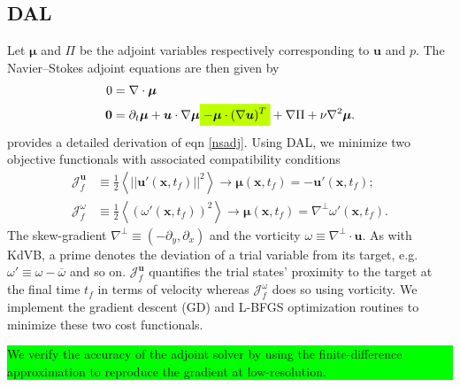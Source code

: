 \documentclass[%
 reprint,
 amsmath,amssymb,
 aps,
 pre,
]{revtex4-2}
\newcommand{\hly}[1]{\colorbox{lime}{\parbox{\columnwidth}{#1}}}
\newcommand{\highlightmath}[1]{\colorbox{lime}{$\displaystyle #1$}}
\renewcommand{\vec}[1]{\boldsymbol{#1}}
\newcommand{\grad}{\nabla}
\newcommand{\JUf}{\mathcal{J}^{\vec{u}}_f}
\newcommand{\Jwf}{\mathcal{J}^{\omega}_f}
\begin{document}
\subsection{DAL}
\label{NSdal}
Let $\vec{\mu}$ and $\Pi$ be the adjoint variables respectively corresponding to $\vec{u}$ and $p$.
The Navier--Stokes adjoint equations are then given by
\begin{align}
  0 &= \grad\cdot\vec{\mu} \label{nsadj} \\
  \vec{0} &= \partial_t \vec{\mu} + \vec{u}\cdot\grad\vec{\mu} \highlightmath{- \vec{\mu}\cdot(\grad\vec{u})^T} + \grad\Pi + \nu\grad^2\vec{\mu}. \nonumber
\end{align}
\cite{Kerswell2014} provides a detailed derivation of eqn \ref{nsadj}.
Using DAL, we minimize two objective functionals with associated compatibility conditions
\begin{align}
  \JUf &\equiv \frac{1}{2}\left\langle|| \vec{u'}(\vec{x}, t_f)||^2\right\rangle   \rightarrow  \vec{\mu}(\vec{x}, t_f)=-\vec{u'}(\vec{x}, t_f); \\
  \Jwf &\equiv \frac{1}{2}\left\langle\left( \omega'(\vec{x}, t_f)\right)^2\right\rangle \rightarrow  \vec{\mu}(\vec{x}, t_f)=\grad^{\perp}\omega'(\vec{x}, t_f) \label{Jw}.
\end{align}
The skew-gradient $\grad^{\perp}\equiv (-\partial_y, \partial_x)$ and the vorticity $\omega \equiv \grad^{\perp}\cdot\vec{u}$. 
As with KdVB, a prime denotes the deviation of a trial variable from its target, e.g.~$\omega'\equiv\omega-\overline{\omega}$ and so on.
$\JUf$ quantifies the trial states' proximity to the target at the final time $t_f$ in terms of velocity whereas $\Jwf$ does so using vorticity.
We implement the gradient descent (GD) and L-BFGS optimization routines to minimize these two cost functionals.
\hly{We verify the accuracy of the adjoint solver by using the finite-difference approximation to reproduce the gradient at low-resolution.}
\end{document}
